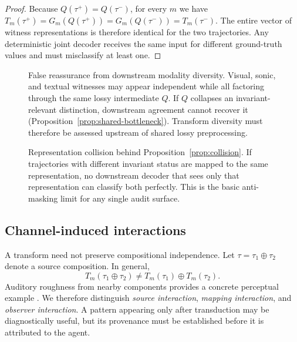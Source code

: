 \documentclass[11pt]{article}
\begin{document}
\begin{proof}
Because $Q(\tau^+)=Q(\tau^-)$, for every $m$ we have $T_m(\tau^+)=G_m(Q(\tau^+))=G_m(Q(\tau^-))=T_m(\tau^-)$. The entire vector of witness representations is therefore identical for the two trajectories. Any deterministic joint decoder receives the same input for different ground-truth values and must misclassify at least one.\qedhere
\end{proof}

\begin{figure}[t]
\centering
\resizebox{0.93\textwidth}{!}{}
\caption{False reassurance from downstream modality diversity. Visual, sonic, and textual witnesses may appear independent while all factoring through the same lossy intermediate $Q$. If $Q$ collapses an invariant-relevant distinction, downstream agreement cannot recover it (Proposition~\ref{prop:shared-bottleneck}). Transform diversity must therefore be assessed upstream of shared lossy preprocessing.}
\label{fig:shared-bottleneck}
\end{figure}

\begin{figure}[t]
\centering
\resizebox{0.98\linewidth}{!}{}
\caption{Representation collision behind Proposition~\ref{prop:collision}. If trajectories with different invariant status are mapped to the same representation, no downstream decoder that sees only that representation can classify both perfectly. This is the basic anti-masking limit for any single audit surface.}
\label{fig:collision}
\end{figure}

\subsection{Channel-induced interactions}
A transform need not preserve compositional independence. Let $\tau=\tau_1\oplus\tau_2$ denote a source composition. In general,
\begin{equation}
T_m(\tau_1\oplus\tau_2)
\neq
T_m(\tau_1)\oplus T_m(\tau_2).
\end{equation}
Auditory roughness from nearby components provides a concrete perceptual example \citep{plomp1965tonal}. We therefore distinguish \emph{source interaction}, \emph{mapping interaction}, and \emph{observer interaction}. A pattern appearing only after transduction may be diagnostically useful, but its provenance must be established before it is attributed to the agent.
\end{document}
